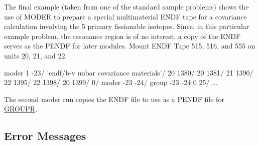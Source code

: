 The final example (taken from one of the standard sample problems)
shows the use of MODER to prepare a special multimaterial ENDF tape
for a covariance calculation involving the 5 primary fissionable isotopes.
Since, in this particular example problem, the resonance region is of
no interest, a copy of the ENDF serves as the PENDF for later modules.
Mount ENDF Tape 515, 516, and 555 on units 20, 21, and 22.

\small
\begin{ccode}

   moder
   1 -23/
   'endf/b-v nubar covariance materials'/
   20 1380/
   20 1381/
   21 1390/
   22 1395/
   22 1398/
   20 1399/
   0/
   moder
   -23 -24/
   group
   -23 -24 0 25/
   ...

\end{ccode}
\normalsize

\noindent
The second moder run copies the ENDF file to use as a PENDF file
for \hyperlink{sGROUPRhy}{GROUPR}.

\subsection{Error Messages}
\label{ssMODER_msg}

